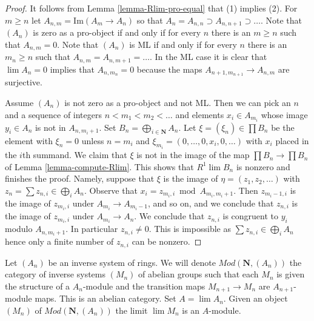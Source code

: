 \begin{proof}
It follows from Lemma \ref{lemma-Rlim-pro-equal} that (1) implies (2).
For $m \geq n$ let $A_{n, m} = \text{Im}(A_m \to A_n)$
so that $A_n = A_{n, n} \supset A_{n, n + 1} \supset \ldots$.
Note that $(A_n)$ is zero as a pro-object if and only if for every
$n$ there is an $m \geq n$ such that $A_{n, m} = 0$.
Note that $(A_n)$ is ML if and only if for every $n$ there is an $m_n \geq n$
such that $A_{n, m} = A_{n, m + 1} = \ldots$. In the ML case it is
clear that $\lim A_n = 0$ implies that $A_{n, m_n} = 0$
because the maps $A_{n + 1, m_{n + 1}} \to A_{n, m}$ are surjective.

\medskip\noindent
Assume $(A_n)$ is not zero as a pro-object and not ML.
Then we can pick an $n$ and a sequence
of integers $n < m_1 < m_2 < \ldots$ and elements
$x_i \in A_{m_i}$ whose image $y_i \in A_n$ is not in $A_{n, m_i + 1}$.
Set $B_n = \bigoplus_{i \in \mathbf{N}} A_n$.
Let $\xi = (\xi_n) \in \prod B_n$ be the element with
$\xi_n = 0$ unless $n = m_i$ and $\xi_{m_i} = (0, \ldots, 0, x_i, 0, \ldots)$
with $x_i$ placed in the $i$th summand. We claim that $\xi$ is not in the
image of the map $\prod B_n \to \prod B_n$ of Lemma \ref{lemma-compute-Rlim}.
This shows that $R^1\lim B_n$ is nonzero and finishes the proof.
Namely, suppose that $\xi$ is the image of $\eta = (z_1, z_2, \ldots)$
with $z_n = \sum z_{n, i} \in \bigoplus_i A_n$.
Observe that $x_i = z_{m_i, i} \bmod A_{m_i, m_i + 1}$.
Then $z_{m_i - 1, i}$ is the image of $z_{m_i, i}$ under
$A_{m_i} \to A_{m_i - 1}$, and so on, and we conclude that
$z_{n, i}$ is the image of $z_{m_i, i}$ under $A_{m_i} \to A_n$.
We conclude that $z_{n, i}$ is congruent to $y_i$ modulo
$A_{n, m_i + 1}$. In particular $z_{n, i} \not = 0$.
This is impossible as $\sum z_{n, i} \in \bigoplus_i A_n$
hence only a finite number of $z_{n, i}$ can be nonzero.
\end{proof}

\noindent
Let $(A_n)$ be an inverse system of rings. We will denote
$\textit{Mod}(\mathbf{N}, (A_n))$ the category of inverse systems
$(M_n)$ of abelian groups such that each $M_n$ is given the
structure of a $A_n$-module and the transition maps
$M_{n + 1} \to M_n$ are $A_{n + 1}$-module maps.
This is an abelian category. Set $A = \lim A_n$.
Given an object $(M_n)$ of $\textit{Mod}(\mathbf{N}, (A_n))$
the limit $\lim M_n$ is an $A$-module.

